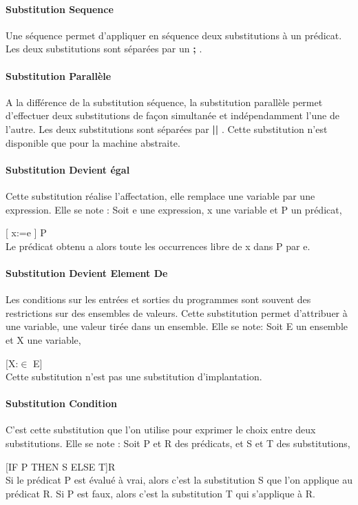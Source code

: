 \paragraph{Substitution Sequence}
Une séquence permet d'appliquer en séquence deux substitutions à un
prédicat. Les deux substitutions sont séparées par un \textbf{;} .

\paragraph{Substitution Parallèle}
A la différence de la substitution séquence, la substitution parallèle permet
d'effectuer deux substitutions de façon simultanée et indépendamment l'une de
l'autre. Les deux substitutions sont séparées par \textbf{||} . Cette substitution n'est
disponible que pour la machine abstraite.

\paragraph{Substitution Devient égal}
Cette substitution réalise l'affectation, elle remplace une variable
par une expression. Elle se note : Soit e une expression, x une
variable et P un prédicat,

[ x:=e ] P \\
Le prédicat obtenu a alors toute les occurrences libre de x dans P par e.

\paragraph{Substitution Devient Element De}
Les conditions sur les entrées et sorties du programmes sont souvent
des restrictions sur des ensembles de valeurs. Cette substitution permet
d'attribuer à une variable, une valeur tirée dans un ensemble. Elle se note:
Soit E un ensemble et X une variable, 

[X:$\in$ E] \\
Cette substitution n'est pas une substitution d'implantation.

\paragraph{Substitution Condition}
C'est cette substitution que l'on utilise pour exprimer le choix entre deux
substitutions. Elle se note : Soit P et R des prédicats, et S et T des
substitutions,

[IF P THEN S ELSE T]R \\
Si le prédicat P est évalué à vrai, alors c'est la substitution S que l'on
applique au prédicat R. Si P est faux, alors c'est la substitution T qui
s'applique à R.

